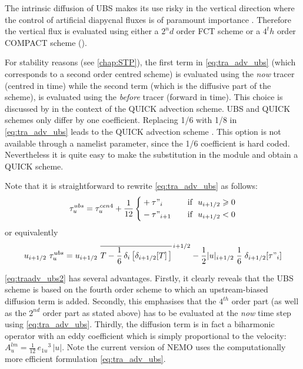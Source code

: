 \documentclass[../main/NEMO_manual]{subfiles}
\begin{document}
The intrinsic diffusion of UBS makes its use risky in the vertical direction where
the control of artificial diapycnal fluxes is of paramount importance
\citep{Shchepetkin_McWilliams_OM05, Demange_PhD2014}.
Therefore the vertical flux is evaluated using either a $2^nd$ order FCT scheme or a $4^th$ order COMPACT scheme
().

For stability reasons (see \autoref{chap:STP}), the first term  in \autoref{eq:tra_adv_ubs}
(which corresponds to a second order centred scheme)
is evaluated using the \textit{now} tracer (centred in time) while the second term
(which is the diffusive part of the scheme),
is evaluated using the \textit{before} tracer (forward in time).
This choice is discussed by \citet{Webb_al_JAOT98} in the context of the QUICK advection scheme.
UBS and QUICK schemes only differ by one coefficient.
Replacing 1/6 with 1/8 in \autoref{eq:tra_adv_ubs} leads to the QUICK advection scheme \citep{Webb_al_JAOT98}.
This option is not available through a namelist parameter, since the 1/6 coefficient is hard coded.
Nevertheless it is quite easy to make the substitution in the  module and obtain a QUICK scheme.

Note that it is straightforward to rewrite \autoref{eq:tra_adv_ubs} as follows:
\[
  \label{eq:traadv_ubs2}
  \tau_u^{ubs} = \tau_u^{cen4} + \frac{1}{12} \left\{
    \begin{aligned}
      & + \tau"_i			& \quad \text{if }\ u_{i+1/2} \geqslant 0 \\
      &  - \tau"_{i+1}		& \quad \text{if }\ u_{i+1/2}       <       0
    \end{aligned}
  \right.
\]
or equivalently 
\[
  u_{i+1/2} \ \tau_u^{ubs}
  =u_{i+1/2} \ \overline{ T - \frac{1}{6}\,\delta_i\left[ \delta_{i+1/2}[T] \,\right] }^{\,i+1/2}
  - \frac{1}{2} |u|_{i+1/2} \;\frac{1}{6} \;\delta_{i+1/2}[\tau"_i]
\]

\autoref{eq:traadv_ubs2} has several advantages.
Firstly, it clearly reveals that the UBS scheme is based on the fourth order scheme to which
an upstream-biased diffusion term is added.
Secondly, this emphasises that the $4^{th}$ order part (as well as the $2^{nd}$ order part as stated above) has to
be evaluated at the \emph{now} time step using \autoref{eq:tra_adv_ubs}.
Thirdly, the diffusion term is in fact a biharmonic operator with an eddy coefficient which
is simply proportional to the velocity:
$A_u^{lm}= \frac{1}{12}\,{e_{1u}}^3\,|u|$.
Note the current version of NEMO uses the computationally more efficient formulation \autoref{eq:tra_adv_ubs}.
\end{document}
